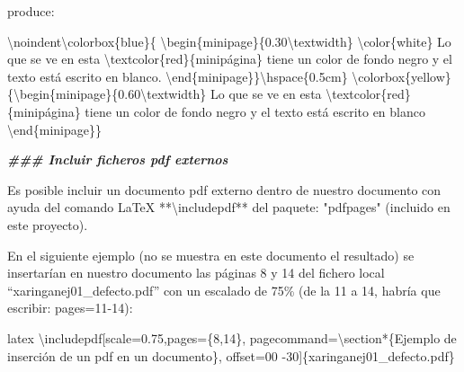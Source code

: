 \documentclass[11pt,a4paper,oneside,]{article}
\newenvironment{Shaded}{\begin{snugshade}}{\end{snugshade}}
\newcommand{\AttributeTok}[1]{\textcolor[rgb]{0.77,0.63,0.00}{#1}}
\newcommand{\DecValTok}[1]{\textcolor[rgb]{0.00,0.00,0.81}{#1}}
\newcommand{\DocumentationTok}[1]{\textcolor[rgb]{0.56,0.35,0.01}{\textbf{\textit{#1}}}}
\newcommand{\FloatTok}[1]{\textcolor[rgb]{0.00,0.00,0.81}{#1}}
\newcommand{\FunctionTok}[1]{\textcolor[rgb]{0.00,0.00,0.00}{#1}}
\newcommand{\NormalTok}[1]{#1}
\newcommand{\SpecialCharTok}[1]{\textcolor[rgb]{0.00,0.00,0.00}{#1}}
\newcommand{\StringTok}[1]{\textcolor[rgb]{0.31,0.60,0.02}{#1}}
\numberwithin{dummy}{section}
\theoremstyle{ocrenumbox}
\theoremstyle{blacknumex}
\theoremstyle{blacknumbox}
\theoremstyle{ocrenum}
\theoremstyle{ocrenum}
\begin{document}
\begin{Shaded}
\begin{Highlighting}[numbers=left,,firstnumber=1101,]
\NormalTok{produce}\SpecialCharTok{:}

\NormalTok{\textbackslash{}noindent\textbackslash{}colorbox\{blue\}\{}
\NormalTok{\textbackslash{}begin\{minipage\}\{}\FloatTok{0.30}\NormalTok{\textbackslash{}textwidth\}}
\NormalTok{\textbackslash{}color\{white\}}
\NormalTok{Lo que se ve en esta \textbackslash{}textcolor\{red\}\{minipágina\} }
\NormalTok{tiene un color de fondo negro y}
\NormalTok{el texto está escrito en blanco. }
\NormalTok{\textbackslash{}end\{minipage\}\}\textbackslash{}hspace\{}\FloatTok{0.5}\NormalTok{cm\} }
\NormalTok{\textbackslash{}colorbox\{yellow\}\{\textbackslash{}begin\{minipage\}\{}\FloatTok{0.60}\NormalTok{\textbackslash{}textwidth\} }
\NormalTok{Lo que se ve en esta \textbackslash{}textcolor\{red\}\{minipágina\} }
\NormalTok{tiene un color de fondo negro y}
\NormalTok{el texto está escrito en blanco}
\NormalTok{\textbackslash{}end\{minipage\}\}}

\StringTok{\textasciigrave{}\textasciigrave{}\textasciigrave{}\textasciigrave{}} \StringTok{\textasciigrave{}\textasciigrave{}\textasciigrave{}\textasciigrave{}} 


\DocumentationTok{\#\#\# Incluir ficheros pdf externos}


\NormalTok{Es posible incluir un documento pdf externo dentro de nuestro documento con ayuda del comando LaTeX }\SpecialCharTok{**}\StringTok{\textasciigrave{}}\AttributeTok{\textbackslash{}includepdf}\StringTok{\textasciigrave{}}\SpecialCharTok{**}\NormalTok{ del paquete}\SpecialCharTok{:} \StringTok{"pdfpages"}\NormalTok{ (incluido en este proyecto). }

\NormalTok{En el siguiente }\FunctionTok{ejemplo}\NormalTok{ (no se muestra en este documento el resultado) se insertarían en nuestro documento las páginas }\DecValTok{8}\NormalTok{ y }\DecValTok{14}\NormalTok{ del fichero local “xaringanej01\_defecto.pdf” con un escalado de }\DecValTok{75}\NormalTok{\% (de la }\DecValTok{11}\NormalTok{ a }\DecValTok{14}\NormalTok{, habría que escribir}\SpecialCharTok{:} \AttributeTok{pages=}\DecValTok{11{-}14}\NormalTok{)}\SpecialCharTok{:}

\StringTok{\textasciigrave{}\textasciigrave{}\textasciigrave{}}\AttributeTok{latex}
\AttributeTok{\textbackslash{}includepdf[scale=0.75,pages=\{8,14\}, }
\AttributeTok{  pagecommand=\textbackslash{}section*\{Ejemplo de inserción de un pdf en un documento\}, }
\AttributeTok{  offset=00 {-}30]\{xaringanej01\_defecto.pdf\}}
\StringTok{\textasciigrave{}\textasciigrave{}\textasciigrave{}}



\end{Highlighting}
\end{Shaded}
\end{document}

